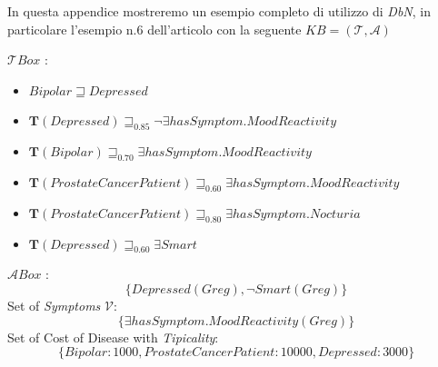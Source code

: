 In questa appendice mostreremo un esempio completo di utilizzo di \textit{DbN}, in particolare
l'esempio n.6 dell'articolo  \cite{ProbOfEx} con la seguente 
$ KB = (\mathcal{T},\mathcal{A}) $

$ \mathcal{T}Box $ :
\begin{itemize}
	\item[] $ Bipolar \sqsupseteq Depressed $
	\item[] $ \mathbf T(Depressed) \sqsupseteq_{0.85} \neg\exists hasSymptom.MoodReactivity $
	\item[] $ \mathbf T(Bipolar) \sqsupseteq_{0.70} \exists hasSymptom.MoodReactivity $
	\item[] $ \mathbf T(ProstateCancerPatient) \sqsupseteq_{0.60} \exists hasSymptom.MoodReactivity $
	\item[] $ \mathbf T(ProstateCancerPatient) \sqsupseteq_{0.80} \exists hasSymptom.Nocturia $
	\item[] $ \mathbf T(Depressed) \sqsupseteq_{0.60} \exists Smart $
\end{itemize}
$\mathcal{A}Box $ :
\[ \{ Depressed(Greg), \neg Smart(Greg) \} \]
Set of \textit{Symptoms} $\mathcal{V} $:
\[ \{ \exists hasSymptom.MoodReactivity(Greg) \} \]
Set of Cost of Disease with \textit{Tipicality}:
\[ \{ Bipolar: 1000, ProstateCancerPatient: 10000, Depressed: 3000 \} \]

